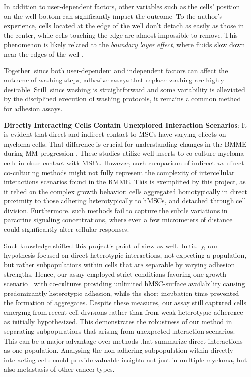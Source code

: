 \noindent In addition to user-dependent factors, other variables such as the cells'
position on the well bottom can significantly impact the outcome. To the
author's experience, cells located at the edge of the well don't detach as
easily as those in the center, while cells touching the edge are almost
impossible to remove. This phenomenon is likely related to the \textit{boundary
      layer effect}, where fluids slow down near the edges of the well
\cite{weyburneNewThicknessShape2014}.

Together, since both user-dependent and independent factors can affect the
outcome of washing steps, adhesive assays that replace washing are highly
desirable. Still, since washing is straightforward and some variability is
alleviated by the disciplined execution of washing protocols, it remains a
common method for adhesion assays.



\textbf{Directly Interacting Cells Contain Unexplored Interaction Scenarios}: It
is evident that direct and indirect contact to \acp{MSC} have varying effects on
myeloma cells. That difference is crucial for understanding changes in the
\ac{BMME} during MM progression \cite{fairfieldMultipleMyelomaCells2020,
      dziadowiczBoneMarrowStromaInduced2022}. These studies utilize well-inserts to
co-culture myeloma cells in close  contact with MSCs. However,
such comparison of indirect \textit{vs.} direct co-culturing methods might not
fully represent the complexity of intercellular interactions
scenarios%
\footterm{\footinteractionscenario}{\label{foot:interactionscenario}}
found in the \ac{BMME}. This is exemplified by
this project, as it relied on the complex growth behavior: \INA cells aggregated
homotypically in direct proximity to those adhering heterotypically to
\acp{hMSC}, and detached through cell division. Furthermore, such methods fail
to capture the subtle variations in paracrine signaling concentrations, where
even a few micrometers of distance could significantly alter cellular responses.

Such knowledge shifted this project's point of view as well: Initially, our
hypothesis focused on direct heterotypic interactions, not expecting a \nMAina
population, but rather subpopulations within \MAina cells that are separable by
varying adhesion strengths. Hence, our assay employed strict conditions favoring
one growth scenario , with co-cultures
providing unlimited hMSC-surface availability causing predominantly heterotypic
adhesion, while the short incubation time prevented the formation of aggregates.
Despite these measures, our assay still captured cells emerging from recent cell
divisions rather than from weak heterotypic adherence as initially hypothesized.
This demonstrates the robustness of our method in separating subpopulations that
arising from unexpected interaction scenarios.
This can be a major advantage over methods that summarize direct interactions
as one population. Analysing the non-adhering subpopulation within directly
interacting cells could provide valuable insights not just in multiple myeloma,
but also metastasis of other cancer types.


